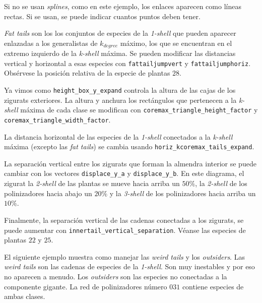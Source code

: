 Si no se usan \textit{splines}, como en este ejemplo, los enlaces aparecen como líneas rectas. Si se usan, se puede indicar cuantos puntos deben tener.

\textit{Fat tails} son los los conjuntos de especies de la \textit{1-shell} que pueden aparecer enlazadas a los generalistas de $k_{degree}$ máximo, los que se encuentran en el extremo izquierdo de la \textit{k-shell} máxima. Se pueden modificar las distancias vertical y horizontal a esas especies con \texttt{fattailjumpvert} y \texttt{fattailjumphoriz}. Obsérvese la posición relativa de la especie de plantas $28$.

Ya vimos como \texttt{height\_box\_y\_expand} controla la altura de las cajas de los zigurats exteriores. La altura y anchura los rectángulos que pertenecen a la \textit{k-shell} máxima de cada clase se modifican con \texttt{coremax\_triangle\_height\_factor} y \texttt{coremax\_triangle\_width\_factor}. 

La distancia horizontal de las especies de la \textit{1-shell} conectados a la \textit{k-shell} máxima (excepto las \textit{fat tails}) se cambia usando \texttt{horiz\_kcoremax\_tails\_expand}.

La separación vertical entre los zigurats que forman la almendra interior se puede cambiar con los vectores \texttt{displace\_y\_a} y \texttt{displace\_y\_b}. En este diagrama, el zigurat
la \textit{2-shell} de las plantas se mueve hacia arriba un $50\%$, la \textit{2-shell} de los polinizadores hacia abajo un $20\%$ y la \textit{3-shell} de los polinizadores hacia arriba un $10\%$.

Finalmente, la separación vertical de las cadenas conectadas a los zigurats, se puede aumentar con \texttt{innertail\_vertical\_separation}. Véanse las especies de plantas $22$ y $25$.

El siguiente ejemplo muestra como manejar las \textit{weird tails} y los \textit{outsiders}. Las \textit{weird tails} son las cadenas de especies de la \textit{1-shell}. Son muy inestables y por eso no aparecen a menudo. Los \textit{outsiders} son las especies no conectadas a la componente gigante. La red de polinizadores número $031$ contiene especies de ambas clases.

